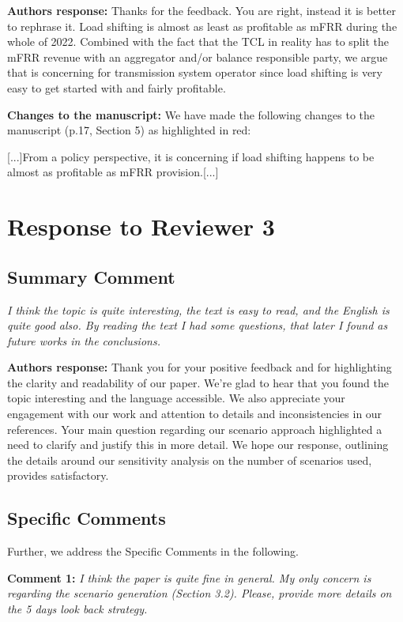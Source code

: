 \documentclass[10pt]{article}
\newcommand{\nt}[1]{\textcolor{newtextcolor}{#1}}
\newcommand{\auth}{\textbf{Authors response: }}
\newcommand{\changes}{\textbf{Changes to the manuscript: }}
\begin{document}
\auth Thanks for the feedback. You are right, instead it is better to rephrase it. Load shifting is almost as least as profitable as mFRR during the whole of 2022. Combined with the fact that the TCL in reality has to split the mFRR revenue with an aggregator and/or balance responsible party, we argue that is concerning for transmission system operator since load shifting is very easy to get started with and fairly profitable.

\changes We have made the following changes to the manuscript (p.17, Section 5) as highlighted in red:

[...]From a policy perspective, it is concerning if load shifting happens to be \nt{almost as} profitable \nt{as} mFRR provision.[...]


\newpage
\section{Response to Reviewer 3}

\subsection{Summary Comment} \textit{I think the topic is quite interesting, the text is easy to read, and the English is quite good also. By reading the text I had some questions, that later I found as future works in the conclusions.}

\auth Thank you for your positive feedback and for highlighting the clarity and readability of our paper. We're glad to hear that you found the topic interesting and the language accessible. We also appreciate your engagement with our work and attention to details and inconsistencies in our references. Your main question regarding our scenario approach highlighted a need to clarify and justify this in more detail. We hope our response, outlining the details around our sensitivity analysis on the number of scenarios used, provides satisfactory.

\subsection{Specific Comments}

Further, we address the Specific Comments in the following.

\textbf{Comment 1:} \textit{I think the paper is quite fine in general. My only concern is regarding the scenario generation (Section 3.2). Please, provide more details on the 5 days look back strategy.}
\end{document}
